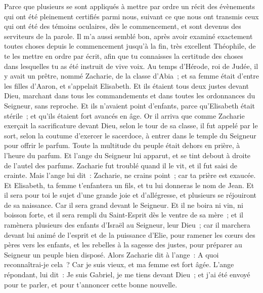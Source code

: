 \begin{multicols}{2}
\VerseOne{}Parce que plusieurs se sont appliqués à mettre par ordre un récit des évènements qui ont été pleinement certifiés parmi nous,
suivant ce que nous ont transmis ceux qui ont été des témoins oculaires, dès le commencement, et sont devenus des serviteurs de la parole.
Il m'a aussi semblé bon, après avoir examiné exactement toutes choses depuis le commencement jusqu'à la fin, très excellent Théophile, de te les mettre en ordre par écrit,
afin que tu connaisses la certitude des choses dans lesquelles tu as été instruit de vive voix.
Au temps d'Hérode, roi de Judée, il y avait un prêtre, nommé Zacharie, de la classe d'Abia~; et sa femme était d'entre les filles d'Aaron, et s'appelait Elisabeth.
Et ils étaient tous deux justes devant Dieu, marchant dans tous les commandements et dans toutes les ordonnances du Seigneur, sans reproche.
Et ils n'avaient point d'enfants, parce qu'Elisabeth était stérile~; et qu'ils étaient fort avancés en âge.
Or il arriva que comme Zacharie exerçait la sacrificature devant Dieu, selon le tour de sa classe, il fut appelé par le sort,
selon la coutume d'exercer le sacerdoce, à entrer dans le temple du Seigneur pour offrir le parfum.
Toute la multitude du peuple était dehors en prière, à l'heure du parfum.
Et l'ange du Seigneur lui apparut, et se tint debout à droite de l'autel des parfums.
Zacharie fut troublé quand il le vit, et il fut saisi de crainte.
Mais l'ange lui dit~: Zacharie, ne crains point~; car ta prière est exaucée. Et Elisabeth, ta femme t'enfantera un fils, et tu lui donneras le nom de Jean.
Et il sera pour toi le sujet d'une grande joie et d'allégresse, et plusieurs se réjouiront de sa naissance.
Car il sera grand devant le Seigneur. Et il ne boira ni vin, ni boisson forte, et il sera rempli du Saint-Esprit dès le ventre de sa mère~;
et il ramènera plusieurs des enfants d'Israël au Seigneur, leur Dieu~;
car il marchera devant lui animé de l'esprit et de la puissance d'Elie, pour ramener les cœurs des pères vers les enfants, et les rebelles à la sagesse des justes, pour préparer au Seigneur un peuple bien disposé.
Alors Zacharie dit à l'ange~: A quoi reconnaîtrai-je cela~? Car je suis vieux, et ma femme est fort âgée.
L'ange répondant, lui dit~: Je suis Gabriel, je me tiens devant Dieu~; et j'ai été envoyé pour te parler, et pour t'annoncer cette bonne nouvelle.

\end{multicols}
